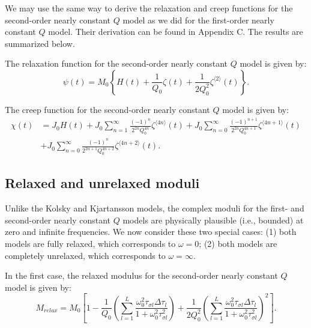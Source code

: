 \documentclass[article]{./macros/elsarticle_qh}
\begin{document}
We may use the same way to derive the relaxation and creep functions for the second-order nearly constant $Q$ model as we did for the first-order nearly constant $Q$ model. Their derivation can be found in Appendix C. The results are summarized below. 

The relaxation function for the second-order nearly constant $Q$ model is given by:
\begin{equation} \label{eq:psi2nd}
\psi(t) = M_{0} \left \{
H(t) + \frac{1}{Q_{0}} \zeta(t) 
+ \frac{1}{2Q_{0}^2} \zeta^{\langle 2 \rangle}(t) 
\right \}.
\end{equation}

The creep function for the second-order nearly constant $Q$ model is given by:
\begin{equation} 
\begin{aligned} \label{eq:chi2nd}
\chi(t) & = J_{0} H(t) + 
J_{0} \sum_{n=1}^{\infty} 
\frac{(-1)^n}{2^{2n} Q_{0}^{4n}} \zeta^{\langle 4n \rangle}(t) 
+ J_{0} \sum_{n=0}^{\infty} 
\frac{(-1)^{n+1}}{2^{2n} Q_{0}^{4n+1}} \zeta^{\langle 4n+1 \rangle}(t)  \\
& + J_{0} \sum_{n=0}^{\infty} 
\frac{(-1)^n}{2^{2n+1} Q_{0}^{4n+2}} \zeta^{\langle 4n+2 \rangle}(t) .
\end{aligned}
\end{equation}

\subsection{Relaxed and unrelaxed moduli}
Unlike the Kolsky and Kjartansson models, the complex moduli for the first- and second-order nearly constant $Q$ models are physically plausible (i.e., bounded) at zero and infinite frequencies. We now consider these two special cases: (1) both models are fully relaxed, which corresponds to $\omega=0$; (2) both models are completely unrelaxed, which corresponds to $\omega=\infty$. 

In the first case, the relaxed modulus for the second-order nearly constant $Q$ model is given by:
\begin{equation} \label{eq:Mrelax}
M_{relax} = M_{0} \left[ 1 - 
\frac{1}{Q_{0}}
\left( \sum_{l=1}^{L} 
\frac{\omega_{0}^2\tau_{\sigma l}\Delta \tau_{l}}{1 + \omega_{0}^2 \tau_{\sigma l}^2}
\right)  
+ \frac{1}{2Q_{0}^2} 
\left( \sum_{l=1}^{L} \frac{\omega_{0}^2\tau_{\sigma l}\Delta \tau_{l}}{1 + \omega_{0}^2 \tau_{\sigma l}^2}
\right)^2 
\right] .
\end{equation}
\end{document}
